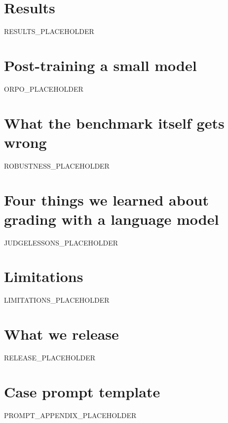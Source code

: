 \documentclass[11pt]{article}
\begin{document}
\section{Results}
\label{sec:results}

RESULTS_PLACEHOLDER

\section{Post-training a small model}
\label{sec:orpo}

ORPO_PLACEHOLDER

\section{What the benchmark itself gets wrong}
\label{sec:robustness}

ROBUSTNESS_PLACEHOLDER

\section{Four things we learned about grading with a language model}
\label{sec:judgelessons}

JUDGELESSONS_PLACEHOLDER

\section{Limitations}
\label{sec:limitations}

LIMITATIONS_PLACEHOLDER

\section{What we release}
\label{sec:release}

RELEASE_PLACEHOLDER



\appendix
\section{Case prompt template}
\label{app:prompt}
PROMPT_APPENDIX_PLACEHOLDER
\end{document}

